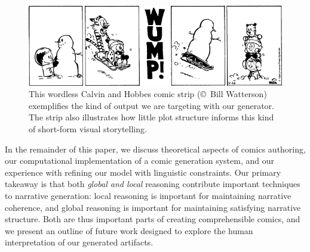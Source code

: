\begin{figure}
\includegraphics[width=\columnwidth]{calvin-and-hobbes.png}
\caption{
This wordless Calvin and Hobbes comic strip ({\small \copyright}~Bill Watterson)
exemplifies the kind of output we are targeting with our generator. The strip also
illustrates how little plot structure informs this kind of short-form visual
storytelling.
}
\label{fig:calvin}
\end{figure}

In the remainder of this paper, we discuss theoretical aspects of comics
authoring, our computational implementation of a comic generation system,
and our experience with refining our model with linguistic constraints. Our
primary takeaway is that both {\em global and local} reasoning contribute
important techniques to narrative generation: local reasoning is important for
maintaining narrative coherence, and global reasoning is important for
maintaining satisfying narrative structure. Both are thus important parts
of creating comprehensible comics, and we present an outline of future work
designed to explore the human interpretation of our generated artifacts.

